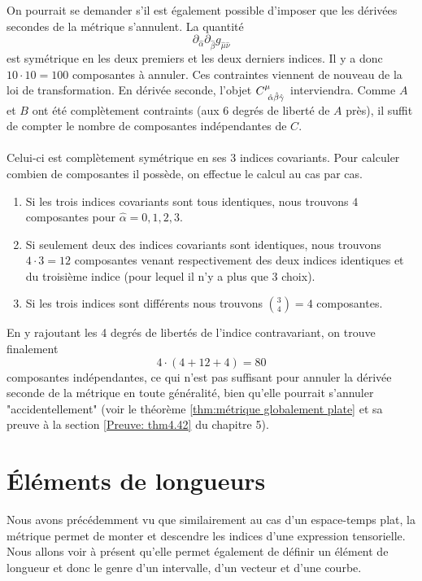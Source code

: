 \begin{rmk}
On pourrait se demander s'il est également possible d'imposer que les dérivées secondes de la métrique s'annulent. La quantité
\begin{equation}
    \partial_{\hat{\alpha}}\partial_{\hat{\beta}}g_{\hat{\mu}\hat{\nu}}
\end{equation}
est symétrique en les deux premiers et les deux derniers indices. Il y a donc $10\cdot 10=100$ composantes à annuler. Ces contraintes viennent de nouveau de la loi de transformation. En dérivée seconde, l'objet $C\indices{^{\mu}_{\!\hat{\alpha}\hat{\beta}\hat{\gamma}}}$ interviendra. Comme $A$ et $B$ ont été complètement contraints (aux 6 degrés de liberté de $A$ près), il suffit de compter le nombre de composantes indépendantes de $C$.\\
\\
Celui-ci est complètement symétrique en ses $3$ indices covariants. Pour calculer combien de composantes il possède, on effectue le calcul au cas par cas. 
\begin{enumerate}
    \item Si les trois indices covariants sont tous identiques, nous trouvons $4$ composantes pour $\hat{\alpha} = 0,1,2,3$.
    \item Si seulement deux des indices covariants sont identiques, nous trouvons $4 \cdot 3 = 12$ composantes venant respectivement des deux indices identiques et du troisième indice (pour lequel il n'y a plus que 3 choix).
    \item Si les trois indices sont différents nous trouvons ${3\choose 4} = 4$ composantes.
\end{enumerate}
En y rajoutant les 4 degrés de libertés de l'indice contravariant, on trouve finalement
\begin{equation}
    4\cdot (4+12+4)=80
\end{equation}
composantes indépendantes, ce qui n'est pas suffisant pour annuler la dérivée seconde de la métrique en toute généralité, bien qu'elle pourrait s'annuler "accidentellement" (voir le théorème \ref{thm:métrique globalement plate} et sa preuve à la section \ref{Preuve: thm4.42} du chapitre 5).
\end{rmk}

\section{Éléments de longueurs}
Nous avons précédemment vu que similairement au cas d'un espace-temps plat, la métrique permet de monter et descendre les indices d'une expression tensorielle. Nous allons voir à présent qu'elle permet également de définir un élément de longueur et donc le genre d'un intervalle, d'un vecteur et d'une courbe. 


